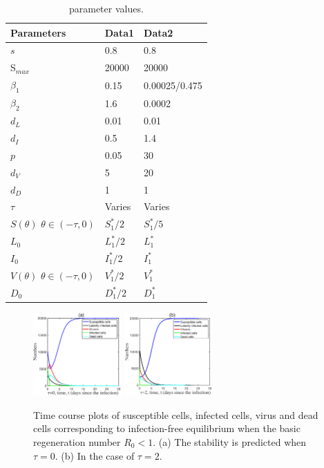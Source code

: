 \documentclass{CMHPhD-SIVD}
\begin{document}
\begin{table}[htbp!]
\setlength{\tabcolsep}{10mm}
\caption{parameter values.}
\centering
\begin{tabular}{l l l}
\hline
Parameters &  Data1 & Data2 \\ \hline
$s$ & 0.8 & 0.8\\
S$_{max}$  &20000 & 20000 \\
$\beta_1$ &0.15  & 0.00025/0.475 \\
$\beta_2$ &1.6 & 0.0002 \\
$d_L$ & 0.01  & 0.01 \\
$d_I$ & 0.5& 1.4 \\
$p$ & 0.05 & 30 \\
$d_V$ & 5  & 20\\
$d_D$ & 1   & 1\\
$\tau$ & Varies   & Varies\\
$S(\theta)$ $\theta\in(-\tau,0)$ & $S_1^*/2$   & $S_1^*/5$ \\
$L_0$ & $L_1^*/2$  & $L_1^*$ \\
$I_0$ & $I_1^*/2$  & $I_1^*$ \\
$V(\theta)$ $\theta\in(-\tau,0)$ & $V_1^*/2$    & $V_1^*$ \\
$D_0$ & $D_1^*/2$    & $D_1^*$ \\ \hline
\end{tabular}
\label{tab3}
\end{table}

\begin{figure}[h!]
\centering
\includegraphics[height=0.16\textheight,width=0.3\textwidth]{G3.eps}
\includegraphics[height=0.16\textheight,width=0.3\textwidth]{G1.eps}
\vspace{3mm}
\caption{Time course plots of susceptible cells, infected cells, virus and dead cells corresponding to infection-free equilibrium when the basic regeneration number $R_0<1$. (a) The stability is predicted when $\tau=0$. (b) In the case of $\tau=2$.}
\label{Fig.2A}
\end{figure}
\end{document}

